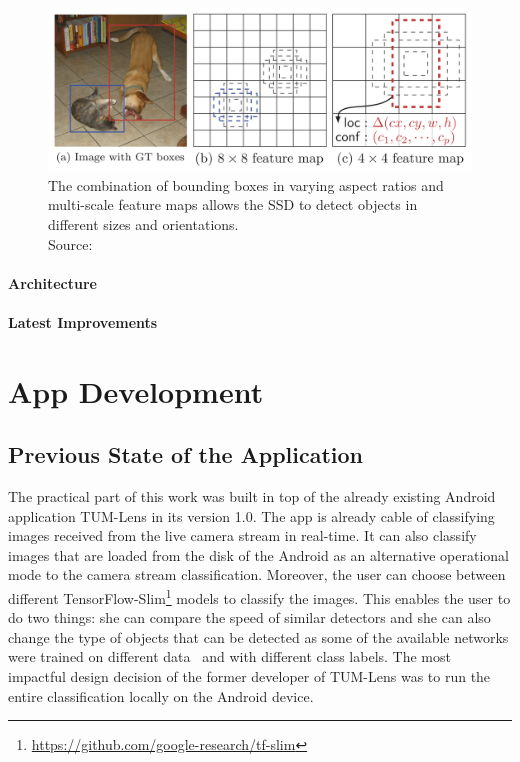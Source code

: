 \documentclass[
			   fontsize=11pt,
               paper=a4,
               bibliography=totoc,
               idxtotoc,
               headsepline,
               footsepline,
               footinclude=false,
               BCOR=12mm,
               DIV=13,
               openany,   %
               ]
               {scrbook}
\begin{document}
\begin{figure}[H] %
	\centering
	\includegraphics[width=\textwidth]{figures/ssd_feature_maps_scaling.png}
	\caption[Detecting Objects at Different Scales Through SSD's Feature Maps]{The combination of bounding boxes in varying aspect ratios and multi-scale feature maps allows the SSD to detect objects in different sizes and orientations.\\
		\tiny{Source:~\cite{detectorSSD}}}
	\label{fig:ssdFeatureMapScaling} %
\end{figure}

\subsection{Architecture}

\subsection{Latest Improvements}


\part{App Development}

\chapter{Previous State of the Application} \label{sec:previousState}

The practical part of this work was built in top of the already existing Android application TUM-Lens in its version 1.0. The app is already cable of classifying images received from the live camera stream in real-time. It can also classify images that are loaded from the disk of the Android as an alternative operational mode to the camera stream classification. Moreover, the user can choose between different TensorFlow-Slim\footnote{\url{https://github.com/google-research/tf-slim}} models to classify the images. This enables the user to do two things: she can compare the speed of similar detectors and she can also change the type of objects that can be detected as some of the available networks were trained on different data~\cite{maxJokel} and with different class labels. The most impactful design decision of the former developer of TUM-Lens was to run the entire classification locally on the Android device.
\end{document}
